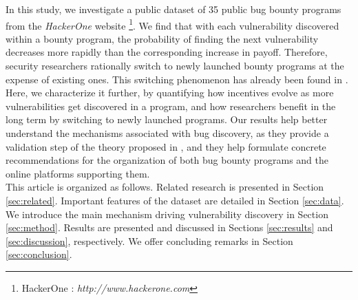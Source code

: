 In this study, we investigate a public dataset of 35 public bug bounty programs from the {\it HackerOne} website \footnote{HackerOne : {\it http://www.hackerone.com}}. We find that with each vulnerability discovered within a bounty program, the probability of finding the next vulnerability decreases more rapidly than the corresponding increase in payoff. Therefore, security researchers rationally switch to newly launched bounty programs at the expense of existing ones. This switching phenomenon has already been found in \cite{zhao2015empirical}. Here, we characterize it further, by quantifying how incentives evolve as more vulnerabilities get discovered in a program, and how researchers benefit in the long term by switching to newly launched programs. Our results help better understand the mechanisms associated with bug discovery, as they provide a validation step of the theory proposed in \cite{brady1999murphy}, and they help formulate concrete recommendations for the organization of both bug bounty programs and the online platforms supporting them.\\

This article is organized as follows. Related research is presented in Section \ref{sec:related}. Important features of the dataset are detailed in Section \ref{sec:data}. We introduce the main mechanism driving vulnerability discovery in Section \ref{sec:method}. Results are presented and discussed in Sections \ref{sec:results} and \ref{sec:discussion}, respectively. We offer concluding remarks in Section \ref{sec:conclusion}.

